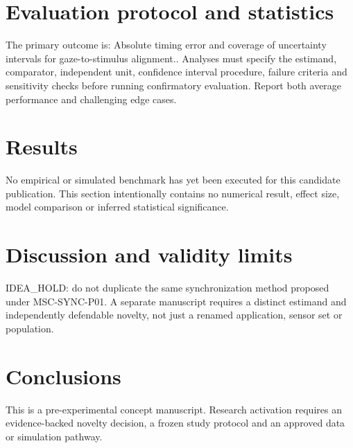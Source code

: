 \documentclass[11pt,a4paper]{article}
\begin{document}
\section{Evaluation protocol and statistics}
The primary outcome is: Absolute timing error and coverage of uncertainty intervals for gaze-to-stimulus alignment.. Analyses must specify the estimand, comparator, independent unit, confidence interval procedure, failure criteria and sensitivity checks before running confirmatory evaluation. Report both average performance and challenging edge cases.
\section{Results}
No empirical or simulated benchmark has yet been executed for this candidate publication. This section intentionally contains no numerical result, effect size, model comparison or inferred statistical significance.
\section{Discussion and validity limits}
IDEA\_HOLD: do not duplicate the same synchronization method proposed under MSC-SYNC-P01. A separate manuscript requires a distinct estimand and independently defendable novelty, not just a renamed application, sensor set or population.
\section{Conclusions}
This is a pre-experimental concept manuscript. Research activation requires an evidence-backed novelty decision, a frozen study protocol and an approved data or simulation pathway.
\end{document}
